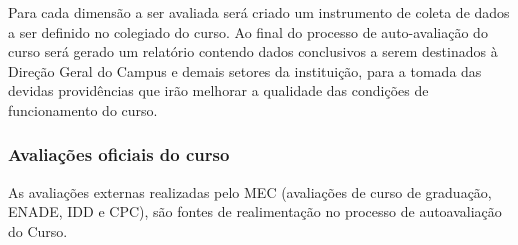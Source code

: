      Para cada dimensão a ser avaliada será criado um instrumento de coleta de dados a ser definido no colegiado do curso. Ao final do processo de auto-avaliação do curso será gerado um relatório contendo dados conclusivos a serem destinados à Direção Geral do Campus e demais setores da instituição, para a tomada das devidas providências que irão melhorar a qualidade das condições de funcionamento do curso.

\subsubsection{Avaliações oficiais do curso}

As avaliações externas realizadas pelo MEC (avaliações de curso de graduação, ENADE, IDD e CPC), são fontes de realimentação no processo de autoavaliação do Curso.
